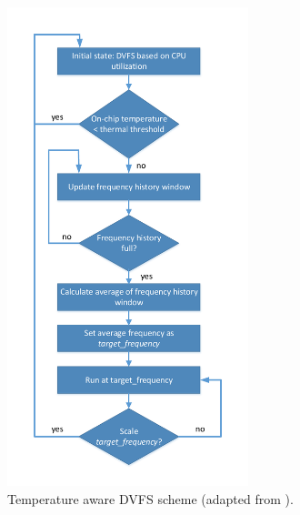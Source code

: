 \documentclass[journal]{IEEEtran}
\begin{document}
	\begin{figure}[h]
	   \centering
	   \includegraphics[width = 7cm]{DTM}
	   \caption{Temperature aware DVFS scheme (adapted from \cite{TempDVFS}).}
	   \label{Figure:DTM}
	\end{figure}	
	\FloatBarrier
\end{document}
